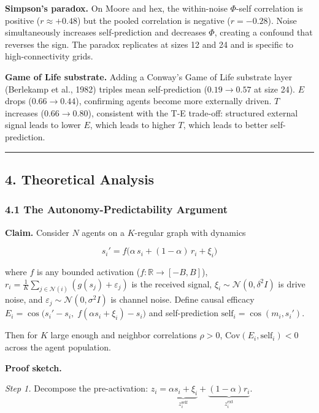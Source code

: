\documentclass[
  11pt,
]{article}
\begin{document}
\textbf{Simpson's paradox.} On Moore and hex, the within-noise
\(\Phi\)-self correlation is positive (\(r \approx +0.48\)) but the
pooled correlation is negative (\(r = -0.28\)). Noise simultaneously
increases self-prediction and decreases \(\Phi\), creating a confound
that reverses the sign. The paradox replicates at sizes 12 and 24 and is
specific to high-connectivity grids.

\textbf{Game of Life substrate.} Adding a Conway's Game of Life
substrate layer (Berlekamp et al., 1982) triples mean self-prediction
(\(0.19 \to 0.57\) at size 24). \(E\) drops (\(0.66 \to 0.44\)),
confirming agents become more externally driven. \(T\) increases
(\(0.66 \to 0.80\)), consistent with the T-E trade-off: structured
external signal leads to lower \(E\), which leads to higher \(T\), which
leads to better self-prediction.

\begin{center}\rule{0.5\linewidth}{0.5pt}\end{center}

\subsection{4. Theoretical Analysis}\label{theoretical-analysis}

\subsubsection{4.1 The Autonomy-Predictability
Argument}\label{the-autonomy-predictability-argument}

\textbf{Claim.} Consider \(N\) agents on a \(K\)-regular graph with
dynamics

\[s_i' = f\!\big(\alpha \, s_i + (1 - \alpha) \, r_i + \xi_i\big)\]

where \(f\) is any bounded activation (\(f: \mathbb{R} \to [-B, B]\)),
\(r_i = \frac{1}{K}\sum_{j \in \mathcal{N}(i)} (g(s_j) + \varepsilon_j)\)
is the received signal, \(\xi_i \sim \mathcal{N}(0, \delta^2 I)\) is
drive noise, and \(\varepsilon_j \sim \mathcal{N}(0, \sigma^2 I)\) is
channel noise. Define causal efficacy
\(E_i = \cos\!\big(s_i' - s_i, \; f(\alpha s_i + \xi_i) - s_i\big)\) and
self-prediction \(\text{self}_i = \cos(m_i, s_i')\).

Then for \(K\) large enough and neighbor correlations \(\rho > 0\),
\(\text{Cov}(E_i, \text{self}_i) < 0\) across the agent population.

\textbf{Proof sketch.}

\emph{Step 1.} Decompose the pre-activation:
\(z_i = \underbrace{\alpha s_i + \xi_i}_{z_i^{\text{self}}} + \underbrace{(1-\alpha) r_i}_{z_i^{\text{ext}}}\).
\end{document}
